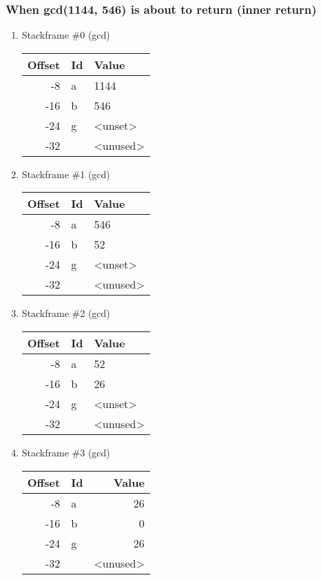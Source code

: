 \documentclass[11pt]{article}
\begin{document}
\subsubsection{When gcd(1144, 546) is about to return  (inner return)}
\label{sec:org67932b4}
\begin{enumerate}
\item Stackframe \#0 (gcd)
\label{sec:orgc63789c}
\begin{center}
\begin{tabular}{rll}
Offset & Id & Value\\
\hline
-8 & a & 1144\\
-16 & b & 546\\
-24 & g & <unset>\\
-32 &  & <unused>\\
\end{tabular}
\end{center}

\item Stackframe \#1 (gcd)
\label{sec:org681da19}
\begin{center}
\begin{tabular}{rll}
Offset & Id & Value\\
\hline
-8 & a & 546\\
-16 & b & 52\\
-24 & g & <unset>\\
-32 &  & <unused>\\
\end{tabular}
\end{center}

\item Stackframe \#2 (gcd)
\label{sec:org029b46b}
\begin{center}
\begin{tabular}{rll}
Offset & Id & Value\\
\hline
-8 & a & 52\\
-16 & b & 26\\
-24 & g & <unset>\\
-32 &  & <unused>\\
\end{tabular}
\end{center}

\item Stackframe \#3 (gcd)
\label{sec:orgbd8fd64}
\begin{center}
\begin{tabular}{rlr}
Offset & Id & Value\\
\hline
-8 & a & 26\\
-16 & b & 0\\
-24 & g & 26\\
-32 &  & <unused>\\
\end{tabular}
\end{center}


\end{enumerate}
\end{document}
